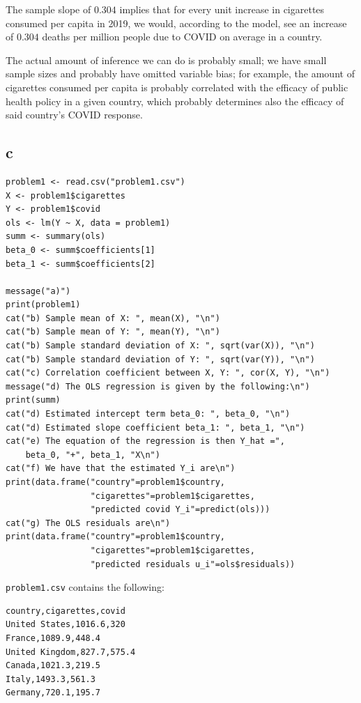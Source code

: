 \documentclass[12pt,letterpaper]{article}
\theoremstyle{definition}
\begin{document}
The sample slope of \(0.304\) implies that for every unit increase in cigarettes consumed per capita in 2019, we would, according to the model, see an increase of \(0.304\) deaths per million people due to COVID on average in a country.

The actual amount of inference we can do is probably small; we have small sample sizes and probably have omitted variable bias; for example, the amount of cigarettes consumed per capita is probably correlated with the efficacy of public health policy in a given country, which probably determines also the efficacy of said country's COVID response.

\subsection*{c}

\begin{Verbatim}[fontsize=\small]
problem1 <- read.csv("problem1.csv")
X <- problem1$cigarettes
Y <- problem1$covid
ols <- lm(Y ~ X, data = problem1)
summ <- summary(ols)
beta_0 <- summ$coefficients[1]
beta_1 <- summ$coefficients[2]

message("a)")
print(problem1)
cat("b) Sample mean of X: ", mean(X), "\n")
cat("b) Sample mean of Y: ", mean(Y), "\n")
cat("b) Sample standard deviation of X: ", sqrt(var(X)), "\n")
cat("b) Sample standard deviation of Y: ", sqrt(var(Y)), "\n")
cat("c) Correlation coefficient between X, Y: ", cor(X, Y), "\n")
message("d) The OLS regression is given by the following:\n")
print(summ)
cat("d) Estimated intercept term beta_0: ", beta_0, "\n")
cat("d) Estimated slope coefficient beta_1: ", beta_1, "\n")
cat("e) The equation of the regression is then Y_hat =",
    beta_0, "+", beta_1, "X\n")
cat("f) We have that the estimated Y_i are\n")
print(data.frame("country"=problem1$country,
                 "cigarettes"=problem1$cigarettes,
                 "predicted covid Y_i"=predict(ols)))
cat("g) The OLS residuals are\n")
print(data.frame("country"=problem1$country,
                 "cigarettes"=problem1$cigarettes,
                 "predicted residuals u_i"=ols$residuals))
\end{Verbatim}

\verb|problem1.csv| contains the following:
\begin{Verbatim}[fontsize=\small]
country,cigarettes,covid
United States,1016.6,320
France,1089.9,448.4
United Kingdom,827.7,575.4
Canada,1021.3,219.5
Italy,1493.3,561.3
Germany,720.1,195.7
\end{Verbatim}
\end{document}
